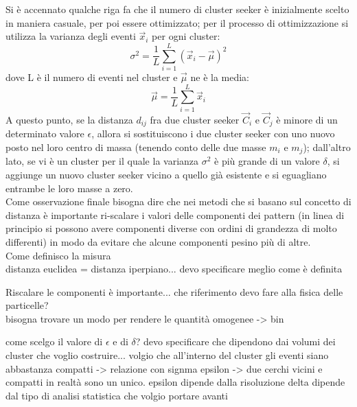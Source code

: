 Si è accennato qualche riga fa che il numero di cluster seeker è inizialmente scelto in maniera casuale, per poi essere ottimizzato; per il processo di ottimizzazione si utilizza la varianza degli eventi $\vec{x}_i$ per ogni cluster:
\begin{equation}
\sigma^2 = \frac{1}{L}\sum_{i=1}^{L} (\vec{x}_i - \vec{\mu})^2
\end{equation}
dove L è il numero di eventi nel cluster e $\vec{\mu}$ ne è la media:
\begin{equation}
\vec{\mu} = \frac{1}{L}\sum_{i=1}^{L} \vec{x}_i
\end{equation}
A questo punto, se la distanza $d_{ij}$ fra due cluster seeker $\vec{C}_i$ e $\vec{C}_j$ è minore di un determinato valore $\epsilon$, allora si sostituiscono i due cluster seeker con uno nuovo posto nel loro centro di massa (tenendo conto delle due masse $m_i$ e $m_j$); dall'altro lato, se vi è un cluster per il quale la varianza $\sigma^2$ è più grande di un valore $\delta$, si aggiunge un nuovo cluster seeker vicino a quello già esistente e si eguagliano entrambe le loro masse a zero.\\
Come osservazione finale bisogna dire che nei metodi che si basano sul concetto di distanza è importante ri-scalare i valori delle componenti dei pattern (in linea di principio si possono avere componenti diverse con ordini di grandezza di molto differenti) in modo da evitare che alcune componenti pesino più di altre. \\ 

\color{red}
Come definisco la misura\\
distanza euclidea = distanza iperpiano... devo specificare meglio come è definita

Riscalare le componenti è importante... che riferimento devo fare alla fisica delle particelle? \\
bisogna trovare un modo per rendere le quantità omogenee -> bin


come scelgo il valore di $\epsilon$ e di $\delta$?
devo specificare che dipendono dai volumi dei cluster che voglio costruire... volgio che all'interno del cluster gli eventi siano abbastanza compatti -> relazione con signma
epsilon -> due cerchi vicini e compatti in realtà sono un unico. 
epsilon dipende dalla risoluzione
delta dipende dal tipo di analisi statistica che volgio portare avanti

\color{black}


\newpage


